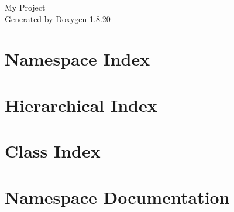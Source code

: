 \let\mypdfximage\pdfximage\def\pdfximage{\immediate\mypdfximage}\documentclass[twoside]{book}
\newcommand{\+}{\discretionary{\mbox{\scriptsize$\hookleftarrow$}}{}{}}
\newcommand{\clearemptydoublepage}{%
  \newpage{\pagestyle{empty}\cleardoublepage}%
}
\begin{document}
\hypersetup{pageanchor=false,
             bookmarksnumbered=true,
             pdfencoding=unicode
            }
\begin{titlepage}
\vspace*{7cm}
\begin{center}%
{\Large My Project }\\
\vspace*{1cm}
{\large Generated by Doxygen 1.8.20}\\
\end{center}
\end{titlepage}
\clearemptydoublepage
{}
\tableofcontents
\clearemptydoublepage
{}
\hypersetup{pageanchor=true}

\chapter{Namespace Index}

\chapter{Hierarchical Index}

\chapter{Class Index}

\chapter{Namespace Documentation}









\end{document}
